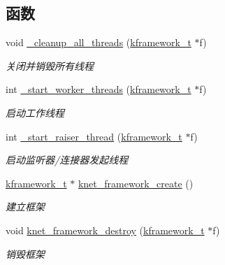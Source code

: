 \subsection*{函数}
\begin{DoxyCompactItemize}
\item 
void \hyperlink{a00052_a9c5bb6308c754d2a46ade4c7fef5907f_a9c5bb6308c754d2a46ade4c7fef5907f}{\+\_\+cleanup\+\_\+all\+\_\+threads} (\hyperlink{a00051_a3195a3be35782fc1efb920c811be111d_a3195a3be35782fc1efb920c811be111d}{kframework\+\_\+t} $\ast$f)
\begin{DoxyCompactList}\small\item\em 关闭并销毁所有线程 \end{DoxyCompactList}\item 
int \hyperlink{a00052_a1ff0491ef03493e3d3b299f4d8f64d0d_a1ff0491ef03493e3d3b299f4d8f64d0d}{\+\_\+start\+\_\+worker\+\_\+threads} (\hyperlink{a00051_a3195a3be35782fc1efb920c811be111d_a3195a3be35782fc1efb920c811be111d}{kframework\+\_\+t} $\ast$f)
\begin{DoxyCompactList}\small\item\em 启动工作线程 \end{DoxyCompactList}\item 
int \hyperlink{a00052_a23f8160552bd4b1a0bca4c2779d49a4d_a23f8160552bd4b1a0bca4c2779d49a4d}{\+\_\+start\+\_\+raiser\+\_\+thread} (\hyperlink{a00051_a3195a3be35782fc1efb920c811be111d_a3195a3be35782fc1efb920c811be111d}{kframework\+\_\+t} $\ast$f)
\begin{DoxyCompactList}\small\item\em 启动监听器/连接器发起线程 \end{DoxyCompactList}\item 
\hyperlink{a00051_a3195a3be35782fc1efb920c811be111d_a3195a3be35782fc1efb920c811be111d}{kframework\+\_\+t} $\ast$ \hyperlink{a00103_ga066683c6d9defb4121552b439d11d7ba_ga066683c6d9defb4121552b439d11d7ba}{knet\+\_\+framework\+\_\+create} ()
\begin{DoxyCompactList}\small\item\em 建立框架 \end{DoxyCompactList}\item 
void \hyperlink{a00103_gaee7016dea12793dae5e6732fb86ee8d0_gaee7016dea12793dae5e6732fb86ee8d0}{knet\+\_\+framework\+\_\+destroy} (\hyperlink{a00051_a3195a3be35782fc1efb920c811be111d_a3195a3be35782fc1efb920c811be111d}{kframework\+\_\+t} $\ast$f)
\begin{DoxyCompactList}\small\item\em 销毁框架 \end{DoxyCompactList}\item 

\end{DoxyCompactItemize}
